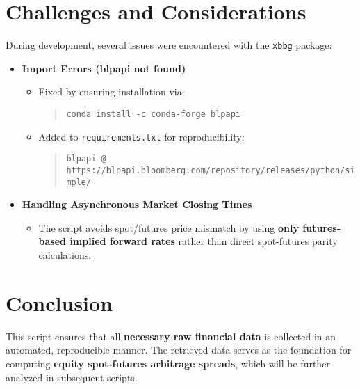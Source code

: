\documentclass{article}
\begin{document}
\section{Challenges and Considerations}
During development, several issues were encountered with the \texttt{xbbg} package:
\begin{itemize}
  \item \textbf{Import Errors (blpapi not found)}
  \begin{itemize}
    \item Fixed by ensuring installation via:
    \begin{quote}
      \texttt{conda install -c conda-forge blpapi}
    \end{quote}
    \item Added to \texttt{requirements.txt} for reproducibility:
    \begin{quote}
      \texttt{blpapi @ https://blpapi.bloomberg.com/repository/releases/python/simple/}
    \end{quote}
  \end{itemize}
  \item \textbf{Handling Asynchronous Market Closing Times}
  \begin{itemize}
    \item The script avoids spot/futures price mismatch by using \textbf{only futures-based implied forward rates} rather than direct spot-futures parity calculations.
  \end{itemize}
\end{itemize}

\section{Conclusion}
This script ensures that all \textbf{necessary raw financial data} is collected in an automated, reproducible manner. The retrieved data serves as the foundation for computing \textbf{equity spot-futures arbitrage spreads}, which will be further analyzed in subsequent scripts.
\end{document}
